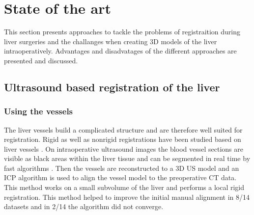 \chapter{State of the art}
This section presents approaches to tackle the problems of registraition during
liver surgeries and the challanges when creating 3D models of the liver
intraoperatively. Advantages and disadvatages of the different approaches are
presented and discussed.
\section{Ultrasound based registration of the liver}



\subsection{Using the vessels}
The liver vessels build a complicated structure and are
therefore well suited for registration. Rigid as well as nonrigid registrations
have been studied based on liver vessels \cite{ribes2012image}\cite{lange20093d}. 
On intraoperative ultrasound images the
blood vessel sections are visible as black areas within the liver tissue and can
be segmented in real time by fast algorithms \cite{ribes2012image}. Then the
vessels are 
reconstructed to a 3D US model and an ICP algorithm is used to align the vessel model to
the preoperative CT data. This method works on a small subvolume of the liver
and performs a local rigid registration. This method helped to improve the
initial manual alignment in 8/14 datasets and in 2/14 the algorithm did not converge.



